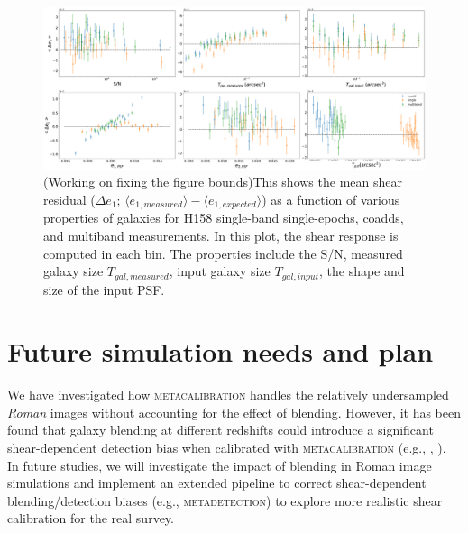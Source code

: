 \documentclass[fleqn,usenatbib]{mnras}
\begin{document}
\begin{figure}
    \centering
	\includegraphics[width=\textwidth]{H158_meanshear_measured_properties_perbin_e1_v2.pdf}
    \caption{(Working on fixing the figure bounds)This shows the mean shear residual ($\Delta e_{1}$; $\langle e_{1,measured} \rangle - \langle e_{1,expected} \rangle$) as a function of various properties of galaxies for H158 single-band single-epochs, coadds, and multiband measurements. In this plot, the shear response is computed in each bin. The properties include the S/N, measured galaxy size $T_{gal,measured}$, input galaxy size $T_{gal,input}$, the shape and size of the input PSF.}
    \label{fig:meanshear}
\end{figure}


\section{Future simulation needs and plan}
\label{sec:discussion}

We have investigated how \textsc{metacalibration} handles the relatively undersampled \emph{Roman} images without accounting for the effect of blending. However, it has been found that galaxy blending at different redshifts could introduce a significant shear-dependent detection bias when calibrated with \textsc{metacalibration} (e.g., \citealt{2020ApJ...902..138S}, \citealt{2020arXiv201208567M}). In future studies, we will investigate the impact of blending in Roman image simulations and implement an extended pipeline to correct shear-dependent blending/detection biases (e.g.,  \textsc{metadetection}) to explore more realistic shear calibration for the real survey. 
\end{document}
